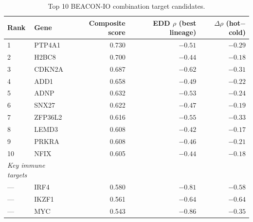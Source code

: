 \documentclass[12pt]{article}
\begin{document}
\begin{table}[h!]
\centering
\caption{Top 10 BEACON-IO combination target candidates.}
\label{tab:top10}
\begin{tabular}{llrrr}
\toprule
\textbf{Rank} & \textbf{Gene} & \textbf{Composite score} & \textbf{EDD $\rho$ (best lineage)} & \textbf{$\Delta\rho$ (hot$-$cold)} \\
\midrule
1 & PTP4A1 & 0.730 & $-0.51$ & $-0.29$ \\
2 & H2BC8 & 0.700 & $-0.44$ & $-0.18$ \\
3 & CDKN2A & 0.687 & $-0.62$ & $-0.31$ \\
4 & ADD1 & 0.658 & $-0.49$ & $-0.22$ \\
5 & ADNP & 0.632 & $-0.53$ & $-0.24$ \\
6 & SNX27 & 0.622 & $-0.47$ & $-0.19$ \\
7 & ZFP36L2 & 0.616 & $-0.55$ & $-0.33$ \\
8 & LEMD3 & 0.608 & $-0.42$ & $-0.17$ \\
9 & PRKRA & 0.608 & $-0.46$ & $-0.21$ \\
10 & NFIX & 0.605 & $-0.44$ & $-0.18$ \\
\midrule
\multicolumn{2}{l}{\textit{Key immune targets}} \\
\midrule
--- & IRF4 & 0.580 & $-0.81$ & $-0.58$ \\
--- & IKZF1 & 0.561 & $-0.64$ & $-0.64$ \\
--- & MYC & 0.543 & $-0.86$ & $-0.35$ \\
\bottomrule
\end{tabular}
\end{table}
\end{document}
